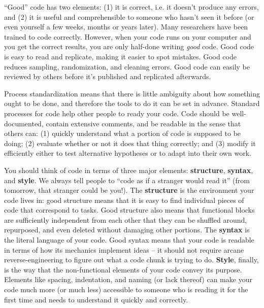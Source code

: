 ``Good'' code has two elements: (1) it is correct, i.e. it doesn't produce any errors,
and (2) it is useful and comprehensible to someone who hasn't seen it before
(or even yourself a few weeks, months or years later).
Many researchers have been trained to code correctly.
However, when your code runs on your computer and you get the correct results,
you are only half-done writing \textit{good} code.
Good code is easy to read and replicate, making it easier to spot mistakes.
Good code reduces sampling, randomization, and cleaning errors.
Good code can easily be reviewed by others before it's published and replicated afterwards.

Process standardization means that there is
little ambiguity about how something ought to be done,
and therefore the tools to do it can be set in advance.
Standard processes for code help other people to ready your code.
Code should be well-documented, contain extensive comments, and be readable in the sense that others can:
(1) quickly understand what a portion of code is supposed to be doing;
(2) evaluate whether or not it does that thing correctly; and
(3) modify it efficiently either to test alternative hypotheses
or to adapt into their own work.

You should think of code in terms of three major elements:
\textbf{structure}, \textbf{syntax}, and \textbf{style}.
We always tell people to ``code as if a stranger would read it''
(from tomorrow, that stranger could be you!).
The \textbf{structure} is the environment your code lives in:
good structure means that it is easy to find individual pieces of code that correspond to tasks.
Good structure also means that functional blocks are sufficiently independent from each other
that they can be shuffled around, repurposed, and even deleted without damaging other portions.
The \textbf{syntax} is the literal language of your code.
Good syntax means that your code is readable
in terms of how its mechanics implement ideas --
it should not require arcane reverse-engineering
to figure out what a code chunk is trying to do.
\textbf{Style}, finally, is the way that the non-functional elements of your code convey its purpose.
Elements like spacing, indentation, and naming (or lack thereof) can make your code much more
(or much less) accessible to someone who is reading it for the first time and needs to understand it quickly and correctly.

